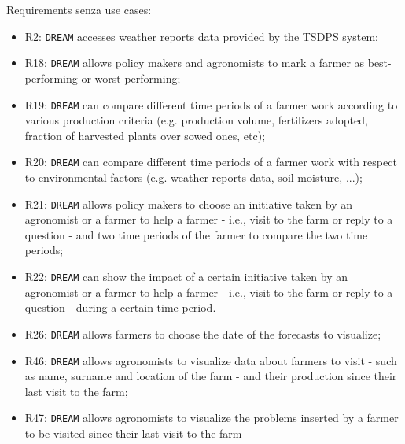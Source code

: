 \documentclass{article}
\begin{document}
\color{red}
Requirements senza use cases:
\begin{itemize}
    \item R2: \verb|DREAM| accesses weather reports data provided by the TSDPS system;
    
    \item R18: \verb|DREAM| allows policy makers and agronomists to mark a farmer as best-performing or worst-performing;
    
    \item R19: \verb|DREAM| can compare different time periods of a farmer work according to various production criteria (e.g. production volume, fertilizers adopted, fraction of harvested plants over sowed ones, etc);
  
    \item R20: \verb|DREAM| can compare different time periods of a  farmer work with respect to environmental factors (e.g. weather reports data, soil moisture, ...);

    \item R21: \verb|DREAM| allows policy makers to choose an initiative taken by an agronomist or a farmer to help a farmer - i.e., visit to the farm or reply to a question - and two time periods of the farmer to compare the two time periods;

    \item R22: \verb|DREAM| can show the impact of a certain initiative taken by an agronomist or a farmer to help a farmer - i.e., visit to the farm or reply to a question - during a certain time period.
    
    \item R26: \verb|DREAM| allows farmers to choose the date of the forecasts to visualize;
    
    \item R46: \verb|DREAM| allows agronomists to visualize data about farmers to visit - such as name, surname and location of the farm -  and their production since their last visit to the farm;
    
    \item R47: \verb|DREAM| allows agronomists to visualize the problems inserted by a farmer to be visited since their last visit to the farm
\end{itemize}
\color{black}

\newpage
\raggedright
\end{document}
